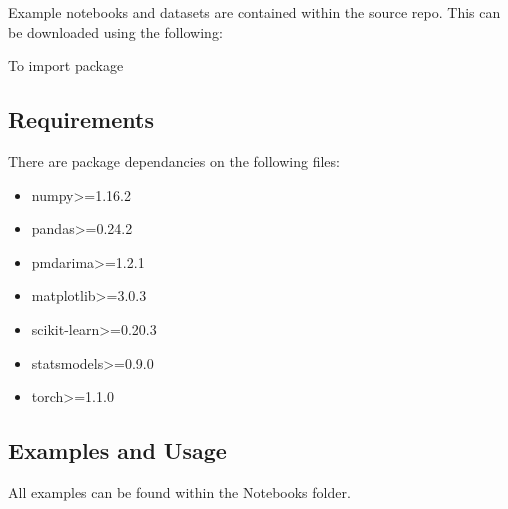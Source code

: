 \documentclass[letterpaper,10pt,english]{sphinxmanual}
\begin{document}
Example notebooks and datasets are contained within the source repo. This can be downloaded using the following:

\begin{sphinxVerbatim}[commandchars=\\\{\}]
  
\end{sphinxVerbatim}

To import package

\begin{sphinxVerbatim}[commandchars=\\\{\}]
   
\end{sphinxVerbatim}


\subsection{Requirements}
\label{\detokenize{intro:requirements}}
There are package dependancies on the following files:
\begin{itemize}
\item {} 
numpy\textgreater{}=1.16.2

\item {} 
pandas\textgreater{}=0.24.2

\item {} 
pmdarima\textgreater{}=1.2.1

\item {} 
matplotlib\textgreater{}=3.0.3

\item {} 
scikit-learn\textgreater{}=0.20.3

\item {} 
statsmodels\textgreater{}=0.9.0

\item {} 
torch\textgreater{}=1.1.0

\end{itemize}


\subsection{Examples and Usage}
\label{\detokenize{intro:examples-and-usage}}
All examples can be found within the Notebooks folder.
\end{document}
